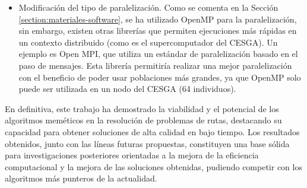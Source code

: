 \begin{itemize}
    \item Modificación del tipo de paralelización. Como se comenta en la Sección \ref{section:materiales-software}, se ha utilizado OpenMP para la paralelización, sin embargo, existen otras librerías que permiten ejecuciones más rápidas en un contexto distribuido (como es el supercomputador del CESGA). Un ejemplo es Open MPI, que utiliza un estándar de paralelización basado en el paso de mensajes. Esta librería permitiría realizar una mejor paralelización con el beneficio de poder usar poblaciones más grandes, ya que OpenMP solo puede ser utilizada en un nodo del CESGA (64 individuos).
\end{itemize}

En definitiva, este trabajo ha demostrado la viabilidad y el potencial de los algoritmos meméticos en la resolución de problemas de rutas, destacando su capacidad para obtener soluciones de alta calidad en bajo tiempo. Los resultados obtenidos, junto con las líneas futuras propuestas, constituyen una base sólida para investigaciones posteriores orientadas a la mejora de la eficiencia computacional y la mejora de las soluciones obtenidas, pudiendo competir con los algoritmos más punteros de la actualidad.